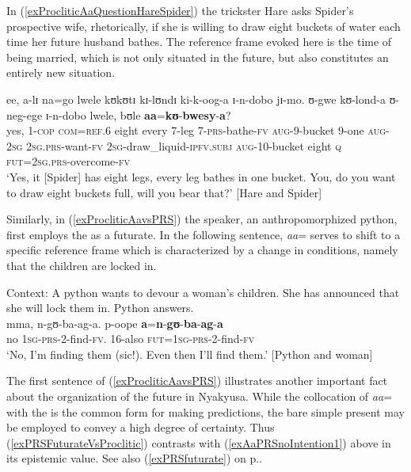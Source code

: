 In (\ref{exProcliticAaQuestionHareSpider}) the trickster Hare asks Spider's prospective wife, rhetorically, if she is willing to draw eight buckets of water each time her future husband bathes. The reference frame evoked here is the time of being married, which is not only situated in the future, but also constitutes an entirely new situation.

\begin{exe}
\ex \label{exProcliticAaQuestionHareSpider}\gll ee, a-lɪ na=go lwele kʊkʊtɪ kɪ-lʊndɪ ki-k-oog-a ɪ-n-dobo jɪ-mo. ʊ-gwe kʊ-lond-a ʊ-neg-ege ɪ-n-dobo lwele, bʊle \textbf{aa}=\textbf{kʊ}-\textbf{bwesy}-\textbf{a}?\\
yes, 1-\textsc{cop} \textsc{com}=\textsc{ref.6} eight every 7-leg 7-\textsc{prs}-bathe-\textsc{fv} \textsc{aug}-9-bucket 9-one \textsc{aug}-\textsc{2sg} \textsc{2sg.prs}-want-\textsc{fv} \textsc{2sg}-draw\_liquid-\textsc{ipfv.subj} \textsc{aug}-10-bucket eight \textsc{q} \textsc{fut}=\textsc{2sg.prs}-overcome-\textsc{fv}\\
\glt `Yes, it [Spider] has eight legs, every leg bathes in one bucket. You, do you want to draw eight buckets full, will you bear that?' [Hare and Spider]
\end{exe}

Similarly, in (\ref{exProcliticAavsPRS}) the speaker, an anthropomorphized python, first employs the  as a  futurate. In the following sentence, \textit{aa}= serves to shift to a specific reference frame which is characterized by a change in conditions, namely that the children are locked in.

\begin{exe}
\ex \label{exProcliticAavsPRS}
Context: A python wants to devour a woman's children. She has announced that she will lock them in. Python answers.\\
\gll mma, n-gʊ-ba-ag-a. p-oope \textbf{a}=\textbf{n}-\textbf{gʊ}-\textbf{ba}-\textbf{ag}-\textbf{a}\\
no \textsc{1sg}-\textsc{prs}-2-find-\textsc{fv}. 16-also \textsc{fut}=\textsc{1sg}-\textsc{prs}-2-find-\textsc{fv}\\
\glt \lq No, I'm finding them (sic!). Even then I'll find them.' [Python and woman]
\end{exe}

The first sentence of (\ref{exProcliticAavsPRS}) illustrates another important fact about the organization of the future in Nyakyusa. While the collocation of \textit{aa}= with the  is the common form for making predictions, the bare simple present may be employed to convey a high degree of certainty. Thus (\ref{exPRSFuturateVsProclitic}) contrasts with (\ref{exAaPRSnoIntention1}) above in its epistemic value. See also (\ref{exPRSfuturate}) on p.\nobreakspace\pageref{exPRSfuturate}.

